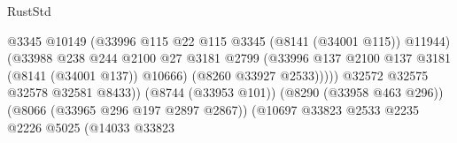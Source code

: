 \begin{lexlean}{RustStd}
\begin{coremodule}
                                                          @3345
                                                          @10149
                                                          (@33996
                                                            @115
                                                            @22
                                                            @115
                                                            @3345
                                                            (@8141 (@34001 @115))
                                                            @11944)
                                                          (@33988
                                                            @238
                                                            @244
                                                            @2100
                                                            @27
                                                            @3181
                                                            @2799
                                                            (@33996
                                                              @137
                                                              @2100
                                                              @137
                                                              @3181
                                                              (@8141 (@34001 @137))
                                                              @10666)
                                                            (@8260 @33927 @2533)))))
                                                    @32572
                                                    @32575
                                                    @32578
                                                    @32581
                                                    @8433))
                                                (@8744 (@33953 @101))
                                                (@8290 (@33958 @463 @296))
                                                (@8066 (@33965 @296 @197 @2897 @2867))
                                                (@10697
                                                  @33823
                                                  @2533
                                                  @2235
                                                  @2226
                                                  @5025
                                                  (@14033
                                                    @33823

\end{coremodule}
\end{lexlean}
